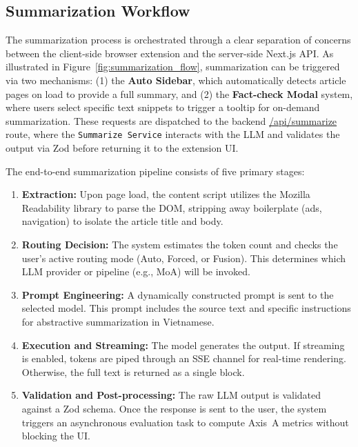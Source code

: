 \subsection{Summarization Workflow}

The summarization process is orchestrated through a clear separation of concerns
between the client-side browser extension and the server-side Next.js API.
As illustrated in Figure~\ref{fig:summarization_flow}, summarization can be triggered 
via two mechanisms: (1) the \textbf{Auto Sidebar}, which automatically detects article 
pages on load to provide a full summary, and (2) the \textbf{Fact-check Modal} system, 
where users select specific text snippets to trigger a tooltip for on-demand 
summarization. These requests are dispatched to the backend \url{/api/summarize} 
route, where the \texttt{Summarize Service} interacts with the LLM and validates 
the output via Zod before returning it to the extension UI.

The end-to-end summarization pipeline consists of five primary stages:

\begin{enumerate}
    \item \textbf{Extraction:} Upon page load, the content script utilizes
          the Mozilla Readability library to parse the DOM, stripping away
          boilerplate (ads, navigation) to isolate the article title and body.
    \item \textbf{Routing Decision:} The system estimates the token count
          and checks the user's active routing mode (Auto, Forced, or Fusion).
          This determines which LLM provider or pipeline (e.g., MoA) will
          be invoked.
    \item \textbf{Prompt Engineering:} A dynamically constructed prompt
          is sent to the selected model. This prompt includes the source
          text and specific instructions for abstractive summarization in
          Vietnamese.
    \item \textbf{Execution and Streaming:} The model generates the output.
          If streaming is enabled, tokens are piped through an SSE channel
          for real-time rendering. Otherwise, the full text is returned
          as a single block.
    \item \textbf{Validation and Post-processing:} The raw LLM output is
          validated against a Zod schema. Once the response is sent to the
          user, the system triggers an asynchronous evaluation task to
          compute Axis~A metrics without blocking the UI.
\end{enumerate}

